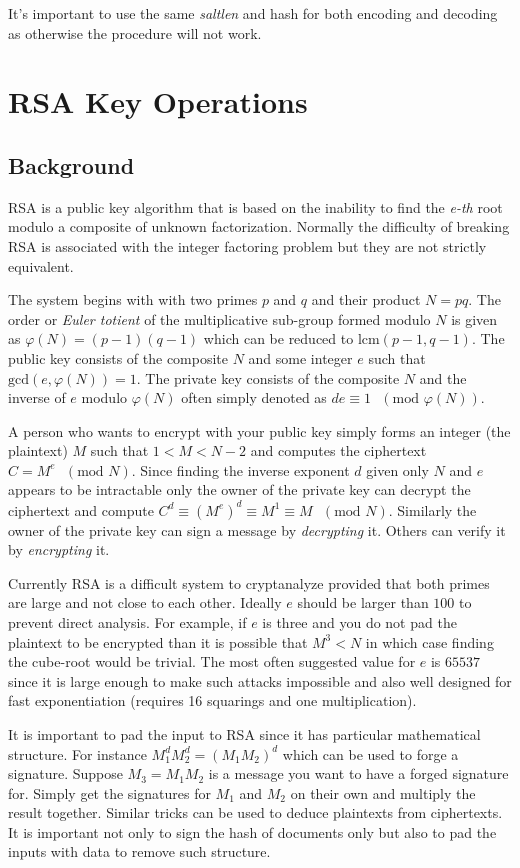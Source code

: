 \documentclass[synpaper]{book}
\def\phi{\varphi}
\newcommand{\mysection}[1]    %
	{                   %
	\section{#1}
   \markboth{\textsf{www.libtom.org}}{\thesection ~ {#1}}
	}
\begin{document}
It's important to use the same \textit{saltlen} and hash for both encoding and decoding as otherwise the procedure will not work.

\mysection{RSA Key Operations}
\subsection{Background}

RSA is a public key algorithm that is based on the inability to find the \textit{e-th} root modulo a composite of unknown
factorization.  Normally the difficulty of breaking RSA is associated with the integer factoring problem but they are
not strictly equivalent.

The system begins with with two primes $p$ and $q$ and their product $N = pq$.  The order or \textit{Euler totient} of the
multiplicative sub-group formed modulo $N$ is given as $\phi(N) = (p - 1)(q - 1)$ which can be reduced to
$\mbox{lcm}(p - 1, q - 1)$.  The public key consists of the composite $N$ and some integer $e$ such that
$\mbox{gcd}(e, \phi(N)) = 1$.  The private key consists of the composite $N$ and the inverse of $e$ modulo $\phi(N)$
often simply denoted as $de \equiv 1\mbox{ }(\mbox{mod }\phi(N))$.

A person who wants to encrypt with your public key simply forms an integer (the plaintext) $M$ such that
$1 < M < N-2$ and computes the ciphertext $C = M^e\mbox{ }(\mbox{mod }N)$.  Since finding the inverse exponent $d$
given only $N$ and $e$ appears to be intractable only the owner of the private key can decrypt the ciphertext and compute
$C^d \equiv \left (M^e \right)^d \equiv M^1 \equiv M\mbox{ }(\mbox{mod }N)$.  Similarly the owner of the private key
can sign a message by \textit{decrypting} it.  Others can verify it by \textit{encrypting} it.

Currently RSA is a difficult system to cryptanalyze provided that both primes are large and not close to each other.
Ideally $e$ should be larger than $100$ to prevent direct analysis.  For example, if $e$ is three and you do not pad
the plaintext to be encrypted than it is possible that $M^3 < N$ in which case finding the cube-root would be trivial.
The most often suggested value for $e$ is $65537$ since it is large enough to make such attacks impossible and also well
designed for fast exponentiation (requires 16 squarings and one multiplication).

It is important to pad the input to RSA since it has particular mathematical structure.  For instance
$M_1^dM_2^d = (M_1M_2)^d$ which can be used to forge a signature.  Suppose $M_3 = M_1M_2$ is a message you want
to have a forged signature for.  Simply get the signatures for $M_1$ and $M_2$ on their own and multiply the result
together.  Similar tricks can be used to deduce plaintexts from ciphertexts.  It is important not only to sign
the hash of documents only but also to pad the inputs with data to remove such structure.
\end{document}
